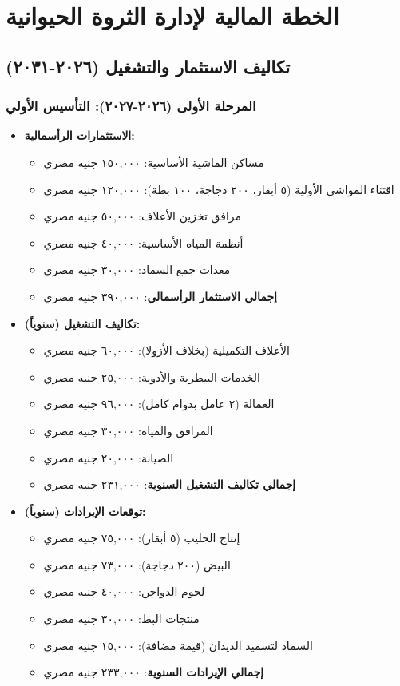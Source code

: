 \section{الخطة المالية لإدارة الثروة الحيوانية}

\subsection{تكاليف الاستثمار والتشغيل (٢٠٢٦-٢٠٣١)}

\subsubsection{المرحلة الأولى (٢٠٢٦-٢٠٢٧): التأسيس الأولي}
\begin{itemize}
    \item \textbf{الاستثمارات الرأسمالية:}
    \begin{itemize}
        \item مساكن الماشية الأساسية: ١٥٠,٠٠٠ جنيه مصري
        \item اقتناء المواشي الأولية (٥ أبقار، ٢٠٠ دجاجة، ١٠٠ بطة): ١٢٠,٠٠٠ جنيه مصري
        \item مرافق تخزين الأعلاف: ٥٠,٠٠٠ جنيه مصري
        \item أنظمة المياه الأساسية: ٤٠,٠٠٠ جنيه مصري
        \item معدات جمع السماد: ٣٠,٠٠٠ جنيه مصري
        \item \textbf{إجمالي الاستثمار الرأسمالي}: ٣٩٠,٠٠٠ جنيه مصري
    \end{itemize}
    
    \item \textbf{تكاليف التشغيل (سنوياً):}
    \begin{itemize}
        \item الأعلاف التكميلية (بخلاف الأزولا): ٦٠,٠٠٠ جنيه مصري
        \item الخدمات البيطرية والأدوية: ٢٥,٠٠٠ جنيه مصري
        \item العمالة (٢ عامل بدوام كامل): ٩٦,٠٠٠ جنيه مصري
        \item المرافق والمياه: ٣٠,٠٠٠ جنيه مصري
        \item الصيانة: ٢٠,٠٠٠ جنيه مصري
        \item \textbf{إجمالي تكاليف التشغيل السنوية}: ٢٣١,٠٠٠ جنيه مصري
    \end{itemize}
    
    \item \textbf{توقعات الإيرادات (سنوياً):}
    \begin{itemize}
        \item إنتاج الحليب (٥ أبقار): ٧٥,٠٠٠ جنيه مصري
        \item البيض (٢٠٠ دجاجة): ٧٣,٠٠٠ جنيه مصري
        \item لحوم الدواجن: ٤٠,٠٠٠ جنيه مصري
        \item منتجات البط: ٣٠,٠٠٠ جنيه مصري
        \item السماد لتسميد الديدان (قيمة مضافة): ١٥,٠٠٠ جنيه مصري
        \item \textbf{إجمالي الإيرادات السنوية}: ٢٣٣,٠٠٠ جنيه مصري
    \end{itemize}
    

\end{itemize}
